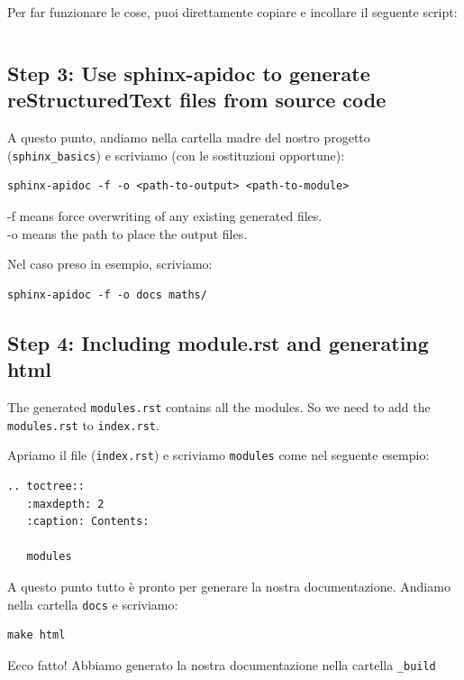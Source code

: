 Per far funzionare le cose, puoi direttamente copiare e incollare il seguente script:

\inputminted{python}{conf.py}


\subsection{Step 3: Use sphinx-apidoc to generate reStructuredText files from source code}

A questo punto, andiamo nella cartella madre del nostro progetto (\texttt{sphinx\_basics}) e scriviamo (con le sostituzioni opportune):

\begin{verbatim}
sphinx-apidoc -f -o <path-to-output> <path-to-module>
\end{verbatim}

-f means force overwriting of any existing generated files.\\
-o means the path to place the output files.

Nel caso preso in esempio, scriviamo:

\begin{verbatim}
sphinx-apidoc -f -o docs maths/
\end{verbatim}


\subsection{Step 4: Including module.rst and generating html}

The generated \texttt{modules.rst} contains all the modules. So we need to add the \texttt{modules.rst} to \texttt{index.rst}.

Apriamo il file (\texttt{index.rst}) e scriviamo \texttt{modules} come nel seguente esempio:

\begin{verbatim}
.. toctree::
   :maxdepth: 2
   :caption: Contents:

   modules
\end{verbatim}


A questo punto tutto è pronto per generare la nostra documentazione. Andiamo nella cartella \texttt{docs} e scriviamo:

\begin{verbatim}
make html
\end{verbatim}

Ecco fatto! Abbiamo generato la nostra documentazione nella cartella \texttt{\_build}